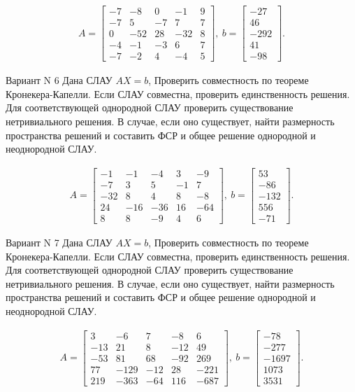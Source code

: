 \documentclass[11pt]{report}
\begin{document}
\begin{align*}
 A = \left[\begin{matrix}-7 & -8 & 0 & -1 & 9\\-7 & 5 & -7 & 7 & 7\\0 & -52 & 28 & -32 & 8\\-4 & -1 & -3 & 6 & 7\\-7 & -2 & 4 & -4 & 5\end{matrix}\right],
\ b = \left[\begin{matrix}-27\\46\\-292\\41\\-98\end{matrix}\right]. 
 \end{align*}

Вариант N 6
Дана СЛАУ $AX = b$,
Проверить совместность по теореме Кронекера-Капелли. Если СЛАУ совместна, проверить единственность решения.
Для соответствующей однородной СЛАУ проверить существование нетривиального решения. В случае, если оно существует,
найти размерность пространства решений и составить ФСР и общее решение однородной  и неоднородной СЛАУ.


\begin{align*}
 A = \left[\begin{matrix}-1 & -1 & -4 & 3 & -9\\-7 & 3 & 5 & -1 & 7\\-32 & 8 & 4 & 8 & -8\\24 & -16 & -36 & 16 & -64\\8 & 8 & -9 & 4 & 6\end{matrix}\right],
\ b = \left[\begin{matrix}53\\-86\\-132\\556\\-71\end{matrix}\right]. 
 \end{align*}

Вариант N 7
Дана СЛАУ $AX = b$,
Проверить совместность по теореме Кронекера-Капелли. Если СЛАУ совместна, проверить единственность решения.
Для соответствующей однородной СЛАУ проверить существование нетривиального решения. В случае, если оно существует,
найти размерность пространства решений и составить ФСР и общее решение однородной  и неоднородной СЛАУ.


\begin{align*}
 A = \left[\begin{matrix}3 & -6 & 7 & -8 & 6\\-13 & 21 & 8 & -12 & 49\\-53 & 81 & 68 & -92 & 269\\77 & -129 & -12 & 28 & -221\\219 & -363 & -64 & 116 & -687\end{matrix}\right],
\ b = \left[\begin{matrix}-78\\-277\\-1697\\1073\\3531\end{matrix}\right]. 
 \end{align*}
\end{document}
